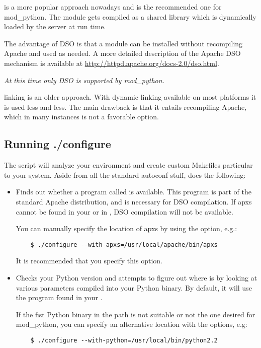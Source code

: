  is a more popular approach nowadays and is the recommended
one for mod_python. The module gets compiled as a shared library which
is dynamically loaded by the server at run time.

The advantage of DSO is that a module can be installed without
recompiling Apache and used as needed.  A more detailed description of
the Apache DSO mechanism is available at
\url{http://httpd.apache.org/docs-2.0/dso.html}.

\emph{At this time only DSO is supported by mod_python.}

 linking is an older approach. With dynamic linking
available on most platforms it is used less and less. The main
drawback is that it entails recompiling Apache, which in many
instances is not a favorable option.

\subsection{Running ./configure\label{inst-configure}}

The  script will analyze your environment and create custom
Makefiles particular to your system. Aside from all the standard
autoconf stuff,  does the following:

\begin{itemize}

\item
  Finds out whether a program called  is available. This
  program is part of the standard Apache distribution, and is necessary
  for DSO compilation. If apxs cannot be found in your  or in
  , DSO compilation will not be available.

  You can manually specify the location of apxs by using the
   option, e.g.:

  \begin{verbatim}
    $ ./configure --with-apxs=/usr/local/apache/bin/apxs        
  \end{verbatim}

  It is recommended that you specify this option.

\item
  Checks your Python version and attempts to figure out where
   is by looking at various parameters compiled into
  your Python binary. By default, it will use the 
  program found in your .

   If the fist Python
  binary in the path is not suitable or not the one desired for
  mod_python, you can specify an alternative location with the
   options, e.g:

  \begin{verbatim}
    $ ./configure --with-python=/usr/local/bin/python2.2
  \end{verbatim}                      

\end{itemize}

